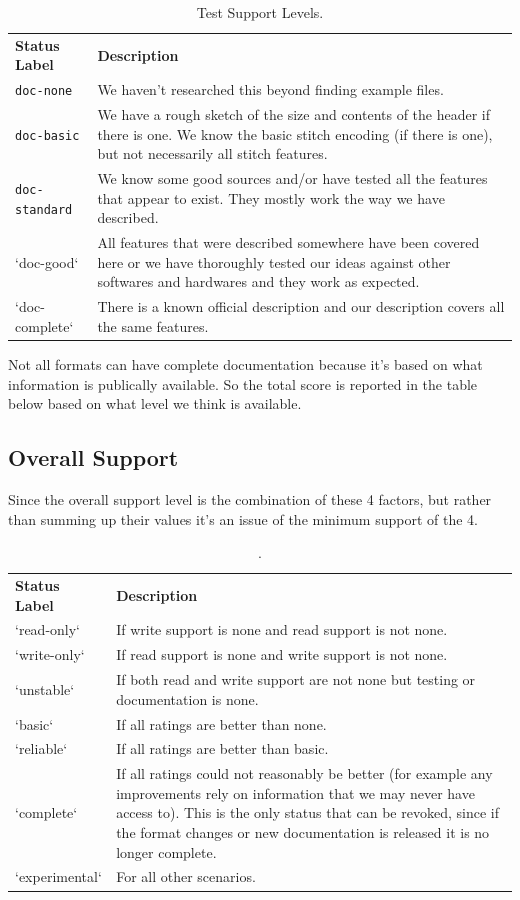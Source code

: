 \documentclass[a4paper]{report}
\begin{document}
\begin{longtable}{p{4cm} p{8cm}}
\caption{Test Support Levels.}
\label{tab:doc-support} \\
\textbf{Status Label} &
\textbf{Description} \\

\texttt{doc-none} &
We haven't researched this beyond finding example files. \\

\texttt{doc-basic} &
We have a rough sketch of the size and contents of the header if there is one.
We know the basic stitch encoding (if there is one), but not necessarily all
stitch features. \\

\texttt{doc-standard} &
We know some good sources and/or have tested all the features that appear to
exist. They mostly work the way we have described. \\

`doc-good` &
All features that were described somewhere have been covered here or we have
thoroughly tested our ideas against other softwares and hardwares and they work
as expected. \\

`doc-complete` &
There is a known official description and our description covers all the same
features.
\end{longtable}

Not all formats can have complete documentation because it's based on what
information is publically available. So the total score is reported in the table
below based on what level we think is available.

\subsection{Overall Support}

Since the overall support level is the combination of these
4 factors, but rather than summing up their values it's an
issue of the minimum support of the 4.

\begin{table}
\begin{tabular}{l l}
\textbf{Status Label} &
\textbf{Description}
\\
`read-only` &
If write support is none and read support is not none.
\\
`write-only` &
If read support is none and write support is not none.
\\
`unstable` &
If both read and write support are not none but testing or documentation is none.
\\
`basic` &
If all ratings are better than none.
\\
`reliable` &
If all ratings are better than basic.
\\
`complete` &
If all ratings could not reasonably be better (for example any improvements
rely on information that we may never have access to). This is the only status
that can be revoked, since if the format changes or new documentation is
released it is no longer complete.
\\
`experimental` &
For all other scenarios.
\end{tabular}
\caption{.}
\end{table}
\end{document}
